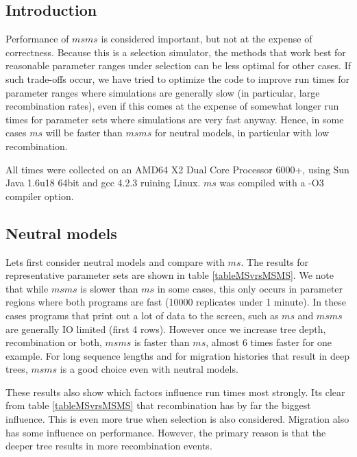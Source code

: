 \documentclass{article}
\begin{document}
\subsection{Introduction}
Performance of $msms$ is considered important, but not at the expense of
correctness. Because this is a selection simulator, the methods that work best
for reasonable parameter ranges under selection can be less optimal for other
cases. If such trade-offs occur, we have tried to optimize the code to improve
run times for parameter ranges where simulations are generally slow (in
particular, large recombination rates), even if this comes at the expense of
somewhat longer run times for parameter sets where simulations are very fast
anyway.  Hence, in some cases $ms$ will be faster than $msms$ for neutral models,
in particular with low recombination. 

All times were
collected on an AMD64 X2 Dual Core Processor 6000+, using Sun Java 1.6u18 64bit
and gcc 4.2.3 ruining Linux. $ms$ was compiled with a -O3 compiler option.

\subsection{Neutral models}

Lets first consider neutral models and compare with $ms$. The results for
representative parameter sets are shown in table \ref{tableMSvrsMSMS}. We note
that while $msms$ is slower than $ms$ in some cases, this only occurs in
parameter regions where both programs are fast (10000 replicates under 1 minute).
In these cases programs that print out a lot of data to the screen, such as $ms$
and $msms$ are generally IO limited (first 4 rows). However once we increase tree
depth, recombination or both, $msms$ is faster than $ms$,  almost 6 times faster
for one example. For long sequence lengths and for migration histories that
result in deep trees, $msms$ is a good choice even with neutral models.

These results also show which factors influence run times most strongly. Its
clear from table \ref{tableMSvrsMSMS} that recombination has by far the biggest
influence. This is even more true when selection is also considered. Migration also has
some influence on performance. However, the primary reason is that the deeper
tree results in more recombination events.
\end{document}
